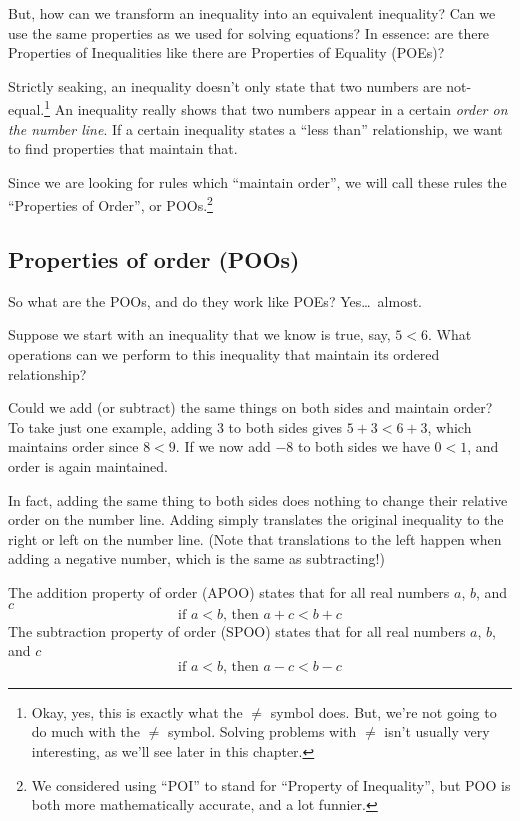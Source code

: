 But, how can we transform an inequality into an equivalent inequality? Can we use the same properties as we used for solving equations? In essence: are there Properties of Inequalities like there are Properties of Equality (POEs)?

Strictly seaking, an inequality doesn't only state that two numbers are not-equal.\footnote{Okay, yes, this is exactly what the $\neq$ symbol does. But, we're not going to do much with the $\neq$ symbol. Solving problems with $\neq$ isn't usually very interesting, as we'll see later in this chapter.} An inequality really shows that two numbers appear in a certain \textit{order on the number line}. If a certain inequality states a ``less than'' relationship, we want to find properties that maintain that.

Since we are looking for rules which ``maintain order'', we will call these rules the ``Properties of Order'', or POOs.\footnote{We considered using ``POI'' to stand for ``Property of Inequality'', but POO is both more mathematically accurate, and a lot funnier.}

\subsection{Properties of order (POOs)}

So what are the POOs, and do they work like POEs? Yes\ldots\ almost.

Suppose we start with an inequality that we know is true, say, $5 < 6$. What operations can we perform to this inequality that maintain its ordered relationship?

Could we add (or subtract) the same things on both sides and maintain order? To take just one example, adding 3 to both sides gives $5+3 < 6+3$, which maintains order since $8 < 9$. If we now add $-8$ to both sides we have $0<1$, and order is again maintained.

In fact, adding the same thing to both sides does nothing to change their relative order on the number line. Adding simply translates the original inequality to the right or left on the number line. (Note that translations to the left happen when adding a negative number, which is the same as subtracting!)

\begin{boxeddef2col}
The \gls{addition property of order} (APOO) states that for all real numbers $a$, $b$, and $c$  \[\text{if } a < b \text{, then } a + c < b + c\]
\tcblower
The \gls{subtraction property of order} (SPOO) states that for all real numbers $a$, $b$, and $c$  \[\text{if } a < b \text{, then } a - c < b - c\]
\end{boxeddef2col}

